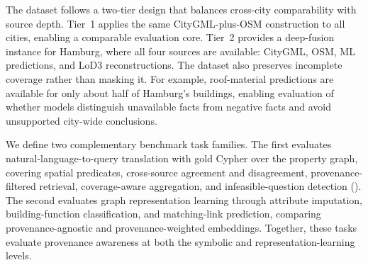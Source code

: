 \documentclass[sigconf,authordraft]{acmart}
\begin{document}
The dataset follows a two-tier design that balances cross-city comparability with source depth. Tier~1 applies the same CityGML-plus-OSM construction to all cities, enabling a comparable evaluation core. Tier~2 provides a deep-fusion instance for Hamburg, where all four sources are available: CityGML, OSM, ML predictions, and LoD3 reconstructions. The dataset also preserves incomplete coverage rather than masking it. For example, roof-material predictions are available for only about half of Hamburg's buildings, enabling evaluation of whether models distinguish unavailable facts from negative facts and avoid unsupported city-wide conclusions.

We define two complementary benchmark task families. The first evaluates natural-language-to-query translation with gold Cypher over the property graph, covering spatial predicates, cross-source agreement and disagreement, provenance-filtered retrieval, coverage-aware aggregation, and infeasible-question detection (). The second evaluates graph representation learning through attribute imputation, building-function classification, and matching-link prediction, comparing provenance-agnostic and provenance-weighted embeddings. Together, these tasks evaluate provenance awareness at both the symbolic and representation-learning levels.
\end{document}
